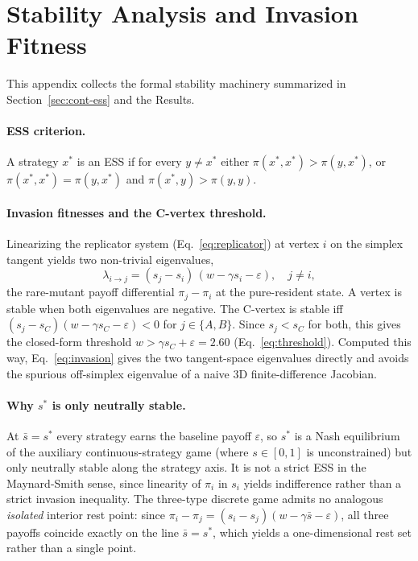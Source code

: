 \documentclass[12pt]{article}
\begin{document}
\printbibliography[title={References}]

\clearpage
\appendix
\renewcommand{\thesection}{Appendix~\Alph{section}}
\section{Stability Analysis and Invasion Fitness}
\label{app:stability}

This appendix collects the formal stability machinery summarized in
Section~\ref{sec:cont-ess} and the Results.

\paragraph{ESS criterion.}
A strategy $x^\ast$ is an ESS \parencite{smith1973logic} if for every
$y \neq x^\ast$ either $\pi(x^\ast, x^\ast) > \pi(y, x^\ast)$, or
$\pi(x^\ast, x^\ast) = \pi(y, x^\ast)$ and
$\pi(x^\ast, y) > \pi(y, y)$.

\paragraph{Invasion fitnesses and the C-vertex threshold.}
Linearizing the replicator system (Eq.~\ref{eq:replicator}) at vertex
$i$ on the simplex tangent yields two non-trivial eigenvalues,
\begin{equation}
  \lambda_{i \to j} = (s_j - s_i)\,(w - \gamma s_i - \varepsilon),
  \quad j \neq i,
  \label{eq:invasion}
\end{equation}
the rare-mutant payoff differential $\pi_j - \pi_i$ at the pure-resident
state. A vertex is stable when both eigenvalues are negative. The
C-vertex is stable iff
$(s_j - s_C)(w - \gamma s_C - \varepsilon) < 0$ for $j \in \{A, B\}$.
Since $s_j < s_C$ for both, this gives the closed-form threshold
$w > \gamma s_C + \varepsilon = 2.60$ (Eq.~\ref{eq:threshold}).
Computed this way, Eq.~\ref{eq:invasion} gives the two tangent-space
eigenvalues directly and avoids the spurious off-simplex eigenvalue of
a naive 3D finite-difference Jacobian.

\paragraph{Why $s^\ast$ is only neutrally stable.}
At $\bar s = s^\ast$ every strategy earns the baseline payoff
$\varepsilon$, so $s^\ast$ is a Nash equilibrium of the auxiliary
continuous-strategy game (where $s \in [0,1]$ is unconstrained) but
only neutrally stable along the strategy axis. It is not a strict ESS
in the Maynard-Smith sense, since linearity of $\pi_i$ in $s_i$ yields
indifference rather than a strict invasion inequality. The three-type
discrete game admits no analogous \emph{isolated} interior rest point:
since $\pi_i - \pi_j = (s_i - s_j)(w - \gamma \bar s - \varepsilon)$,
all three payoffs coincide exactly on the line $\bar s = s^\ast$, which
yields a one-dimensional rest set rather than a single point.
\end{document}
